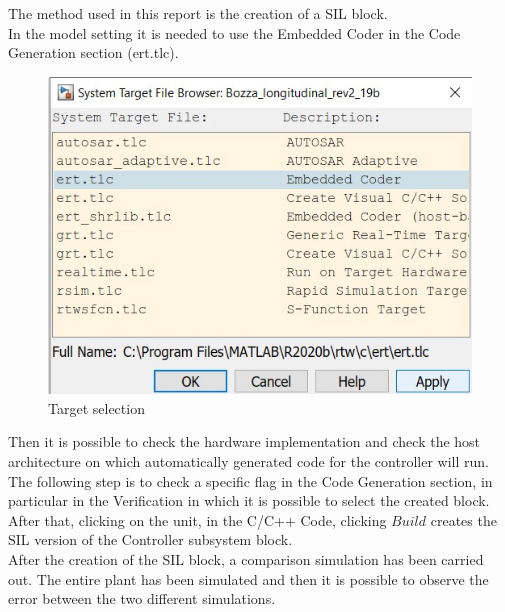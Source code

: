 \documentclass[12pt,a4paper]{report}
\begin{document}
The method used in this report is the creation of a SIL block. \\
In the model setting it is needed to use the Embedded Coder in the Code Generation section (ert.tlc).\\
\begin{figure}[htbp]
	\centering
	\includegraphics[scale=0.7]{ert.jpg}
	\caption{Target selection}
\end{figure} \FloatBarrier

Then it is possible to check the hardware implementation and check the host architecture on which automatically generated code for the controller will run. \\
The following step is to check a specific flag in the Code Generation section, in particular in the Verification in which it is possible to select the created block. 
After that, clicking on the unit, in the C/C++ Code, clicking $Build$ creates the SIL version of the Controller subsystem block. \\
After the creation of the SIL block, a comparison simulation has been carried out. The entire plant has been simulated and then it is possible to observe the error between the two different simulations. \\
\end{document}
